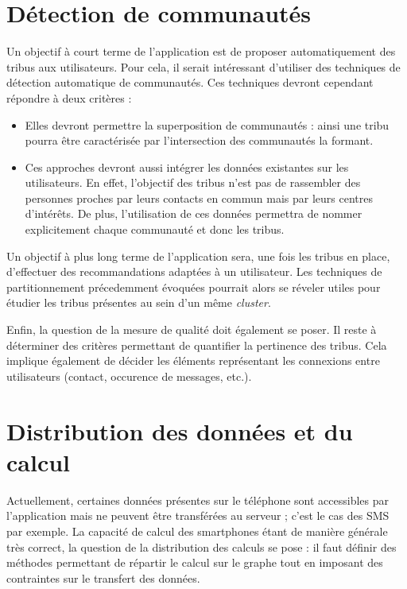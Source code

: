 \documentclass[a4paper]{article}
\begin{document}
\section{D\'etection de communaut\'es}
Un objectif à court terme de l'application est de proposer automatiquement des
tribus aux utilisateurs. Pour cela, il serait int\'eressant d'utiliser des techniques
de d\'etection automatique de communaut\'es. Ces techniques devront cependant r\'epondre
à deux critères :
\begin{itemize}
    \item Elles devront permettre la superposition de communaut\'es : ainsi une tribu
        pourra être caract\'eris\'ee par l'intersection des communaut\'es la formant.
    \item Ces approches devront aussi int\'egrer les donn\'ees existantes sur les
        utilisateurs. En effet, l'objectif des tribus n'est pas de rassembler des
        personnes proches par leurs contacts en commun mais par leurs centres
        d'int\'erêts. De plus, l'utilisation de ces donn\'ees permettra de nommer
        explicitement chaque communaut\'e et donc les tribus.
\end{itemize}

Un objectif à plus long terme de l'application sera, une fois les tribus en place,
d'effectuer des recommandations adapt\'ees à un utilisateur. Les techniques de
partitionnement pr\'ecedemment \'evoqu\'ees pourrait alors se r\'eveler utiles pour \'etudier
les tribus pr\'esentes au sein d'un même \emph{cluster}.

Enfin, la question de la mesure de qualit\'e doit \'egalement se poser. Il reste à d\'eterminer
des critères permettant de quantifier la pertinence des tribus. Cela implique
\'egalement de d\'ecider les \'el\'ements repr\'esentant les connexions entre utilisateurs
(contact, occurence de messages, etc.).

\section{Distribution des donn\'ees et du calcul}
\label{sec:distribution_donnees_calcul}
Actuellement, certaines donn\'ees pr\'esentes sur le t\'el\'ephone sont accessibles par l'application
mais ne peuvent être transf\'er\'ees au serveur ; c'est le cas des SMS par exemple.
La capacit\'e de calcul des smartphones \'etant de manière g\'en\'erale très correct, la question
de la distribution des calculs se pose : il faut d\'efinir des m\'ethodes permettant
de r\'epartir le calcul sur le graphe tout en imposant des contraintes sur le transfert des
donn\'ees.
\end{document}
